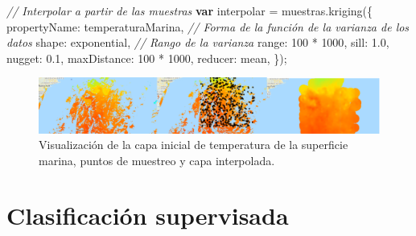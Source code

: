 \documentclass[
  12pt,
  letterpaper,
  twoside]{book}
\newenvironment{Shaded}{\begin{snugshade}}{\end{snugshade}}
\newcommand{\CommentTok}[1]{\textcolor[rgb]{0.24,0.58,0.00}{\textit{#1}}}
\newcommand{\DataTypeTok}[1]{\textcolor[rgb]{0.00,0.00,0.00}{#1}}
\newcommand{\DecValTok}[1]{\textcolor[rgb]{0.28,0.53,0.93}{#1}}
\newcommand{\FloatTok}[1]{\textcolor[rgb]{0.28,0.53,0.93}{#1}}
\newcommand{\FunctionTok}[1]{\textcolor[rgb]{0.48,0.12,0.64}{#1}}
\newcommand{\KeywordTok}[1]{\textcolor[rgb]{0.00,0.00,0.00}{\textbf{#1}}}
\newcommand{\NormalTok}[1]{#1}
\newcommand{\OperatorTok}[1]{\textcolor[rgb]{0.00,0.00,0.00}{#1}}
\newcommand{\StringTok}[1]{\textcolor[rgb]{0.87,0.29,0.22}{#1}}
\begin{document}
\begin{Shaded}
\begin{Highlighting}[]
\CommentTok{// Interpolar a partir de las muestras}
\KeywordTok{var}\NormalTok{ interpolar }\OperatorTok{=}\NormalTok{ muestras}\OperatorTok{.}\FunctionTok{kriging}\NormalTok{(\{}
  \DataTypeTok{propertyName}\OperatorTok{:} \StringTok{\textquotesingle{}temperaturaMarina\textquotesingle{}}\OperatorTok{,}
  \CommentTok{// Forma de la función de la varianza de los datos}
  \DataTypeTok{shape}\OperatorTok{:} \StringTok{\textquotesingle{}exponential\textquotesingle{}}\OperatorTok{,} 
  \CommentTok{// Rango de la varianza}
  \DataTypeTok{range}\OperatorTok{:} \DecValTok{100} \OperatorTok{*} \DecValTok{1000}\OperatorTok{,} 
  \DataTypeTok{sill}\OperatorTok{:} \FloatTok{1.0}\OperatorTok{,}
  \DataTypeTok{nugget}\OperatorTok{:} \FloatTok{0.1}\OperatorTok{,}
  \DataTypeTok{maxDistance}\OperatorTok{:} \DecValTok{100} \OperatorTok{*} \DecValTok{1000}\OperatorTok{,}
  \DataTypeTok{reducer}\OperatorTok{:} \StringTok{\textquotesingle{}mean\textquotesingle{}}\OperatorTok{,}
\NormalTok{\})}\OperatorTok{;}
\end{Highlighting}
\end{Shaded}

\begin{figure}[H]

{\centering \includegraphics[width=0.95\linewidth]{Img/kriging} 

}

\caption{Visualización de la capa inicial de temperatura de la superficie marina, puntos de muestreo y capa interpolada.}\label{fig:fc114}
\end{figure}

\newpage

\hypertarget{clasificaciuxf3n-supervisada}{%
\chapter{Clasificación supervisada}\label{clasificaciuxf3n-supervisada}}
\end{document}
